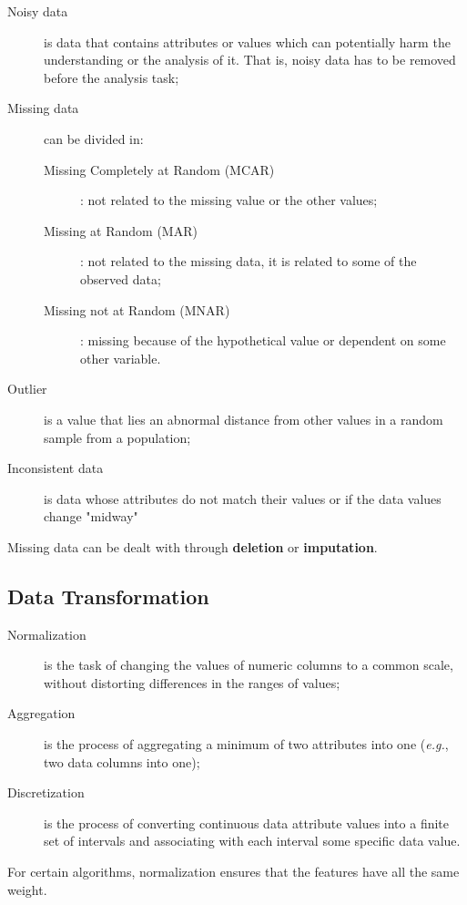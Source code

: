 \documentclass[a4paper]{report}
\begin{document}
\begin{description}
    \item[Noisy data] is data that contains attributes or values which can potentially harm the understanding or the analysis of it. That is, noisy data has to be removed before the analysis task;
    \item[Missing data] can be divided in:
	\begin{description}
	    \item[Missing Completely at Random (MCAR)]: not related to the missing value or the other values;
	    \item[Missing at Random (MAR)]: not related to the missing data, it is related to some of the observed data;
	    \item[Missing not at Random (MNAR)]: missing because of the hypothetical value or dependent on some other variable.
	\end{description}
    \item[Outlier] is a value that lies an abnormal distance from other values in a random sample from a population;
    \item[Inconsistent data] is data whose attributes do not match their values or if the data values change "midway"
\end{description}

Missing data can be dealt with through \textbf{deletion} or \textbf{imputation}.

\subsection*{Data Transformation}

\begin{description}
    \item[Normalization] is the task of changing the values of numeric columns to a common scale, without distorting differences in the ranges of values;
    \item[Aggregation] is the process of aggregating a minimum of two attributes into one (\emph{e.g.}, two data columns into one);
    \item[Discretization] is the process of converting continuous data attribute values into a finite set of intervals and associating with each interval some specific data value.
\end{description}

For certain algorithms, normalization ensures that the features have all the same weight.
\end{document}
